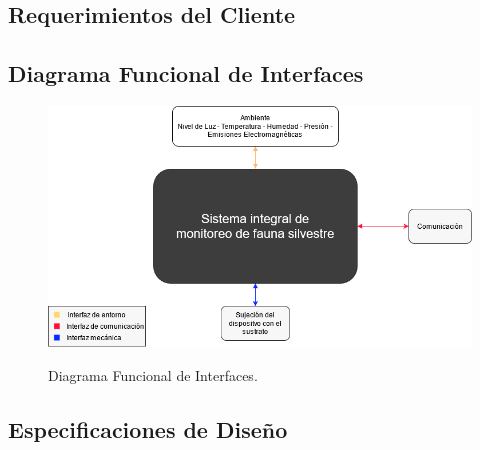 %

%

\subsection{Requerimientos del Cliente}
\label{sec:RequerimientosCliente}


\subsection{Diagrama Funcional de Interfaces}
\label{sec:DiagramaInterfaces}
\begin{figure}[H]
	\centering
	\includegraphics[width=\linewidth]{ImagenesDefinicion/func}
	\label{fig:diagrama_func_interfaces}
	\caption{Diagrama Funcional de Interfaces.}
\end{figure}

\subsection{Especificaciones de Diseño}
\label{sec:EspecificacionesDiseño}


%